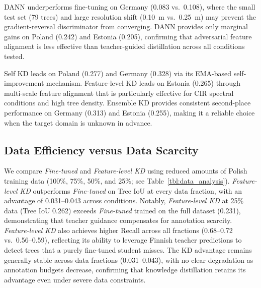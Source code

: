 \documentclass[twocolumn]{article}
\begin{document}
DANN underperforms fine-tuning on Germany (0.083 vs.\ 0.108), where the small test set (79 trees) and large resolution shift (0.10~m vs.\ 0.25~m) may prevent the gradient-reversal discriminator from converging. DANN provides only marginal gains on Poland (0.242) and Estonia (0.205), confirming that adversarial feature alignment is less effective than teacher-guided distillation across all conditions tested.

Self KD leads on Poland (0.277) and Germany (0.328) via its EMA-based self-improvement mechanism. Feature-level KD leads on Estonia (0.265) through multi-scale feature alignment that is particularly effective for CIR spectral conditions and high tree density. Ensemble KD provides consistent second-place performance on Germany (0.313) and Estonia (0.255), making it a reliable choice when the target domain is unknown in advance.

\subsection{Data Efficiency versus Data Scarcity}

We compare \textit{Fine-tuned} and \textit{Feature-level KD} using reduced amounts of Polish training data (100\%, 75\%, 50\%, and 25\%; see Table~\ref{tbl:data_analysis}). \textit{Feature-level KD} outperforms \textit{Fine-tuned} on Tree IoU at every data fraction, with an advantage of 0.031--0.043 across conditions. Notably, \textit{Feature-level KD} at 25\% data (Tree IoU 0.262) exceeds \textit{Fine-tuned} trained on the full dataset (0.231), demonstrating that teacher guidance compensates for annotation scarcity. \textit{Feature-level KD} also achieves higher Recall across all fractions (0.68--0.72 vs.\ 0.56--0.59), reflecting its ability to leverage Finnish teacher predictions to detect trees that a purely fine-tuned student misses. The KD advantage remains generally stable across data fractions (0.031--0.043), with no clear degradation as annotation budgets decrease, confirming that knowledge distillation retains its advantage even under severe data constraints.
\end{document}

